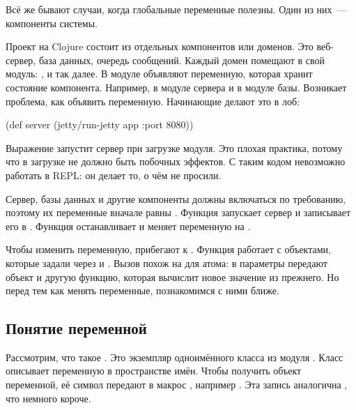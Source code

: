 
Всё же бывают случаи, когда глобальные переменные полезны. Один из них~---
компоненты системы.

Проект на Clojure состоит из отдельных компонентов или доменов. Это веб-сервер,
база данных, очередь сообщений. Каждый домен помещают в свой модуль:
,  и так далее. В модуле объявляют переменную,
которая хранит состояние компонента. Например,  в модуле сервера и
 в модуле базы. Возникает проблема, как объявить
переменную. Начинающие делают это в лоб:

\begin{clojure}
(def server
  (jetty/run-jetty app {:port 8080}))
\end{clojure}

Выражение запустит сервер при загрузке модуля. Это плохая практика, потому что в
загрузке не должно быть побочных эффектов. С таким кодом невозможно работать в
REPL: он делает то, о чём не просили.

Сервер, базы данных и другие компоненты должны включаться по требованию, поэтому
их переменные вначале равны . Функция  запускает
сервер и записывает его в . Функция  останавливает
и меняет переменную на .


Чтобы изменить переменную, прибегают к . Функция работает с
объектами, которые задали через  и . Вызов похож на
 для атома: в параметры передают объект  и другую функцию,
которая вычислит новое значение из прежнего. Но перед тем как менять переменные,
познакомимся с ними ближе.

\ifafive\vspace{15mm}\fi

\subsection{Понятие переменной}

\label{var-section}


Рассмотрим, что такое . Это экземпляр одноимённого класса из модуля
. Класс описывает переменную в пространстве имён.  Чтобы
получить объект переменной, её символ передают в макрос , например
. Эта запись аналогична , что немного короче.

